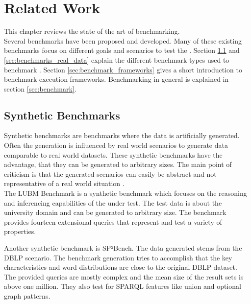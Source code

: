 \chapter{Related Work}
\label{ch:related_work}

This chapter reviews the state of the art of \ts{} benchmarking.\\

Several benchmarks have been proposed and developed.
Many of these existing benchmarks focus on different goals and scenarios to test the \tsp{}.
Section \ref{sec:synthetic_benchmarks} and \ref{sec:benchmarks_real_data} explain the different benchmark types used to benchmark \tsp{}.
Section \ref{sec:benchmark_frameworks} gives a short introduction to benchmark execution frameworks.
Benchmarking in general is explained in section \ref{sec:benchmark}.

\section{Synthetic Benchmarks}
\label{sec:synthetic_benchmarks}
Synthetic benchmarks are benchmarks where the data is artificially generated.
Often the generation is influenced by real world scenarios to generate data comparable to real world datasets\cite{guoLUBMBenchmarkOWL2005}.
These synthetic benchmarks have the advantage, that they can be generated to arbitrary sizes.
The main point of criticism is that the generated scenarios can easily be abstract and not representative of a real world situation \cite{saleemFEASIBLEFeatureBasedSPARQL2015}.\\

The LUBM Benchmark\cite{guoLUBMBenchmarkOWL2005} is a synthetic benchmark which focuses on the reasoning and inferencing capabilities of the \tsp{} under test.
The test data is about the university domain and can be generated to arbitrary size.
The benchmark provides fourteen extensional queries that represent and test a variety of properties.

Another synthetic benchmark is SP²Bench\cite{schmidtSP2BenchSPARQLPerformance2008}.
The data generated stems from the DBLP scenario. The benchmark generation tries to accomplish that the key characteristics and word distributions are close to the original DBLP dataset.
The provided queries are mostly complex and the mean size of the result sets is above one million\cite{saleemFEASIBLEFeatureBasedSPARQL2015}.
They also test for SPARQL features like union and optional graph patterns.

